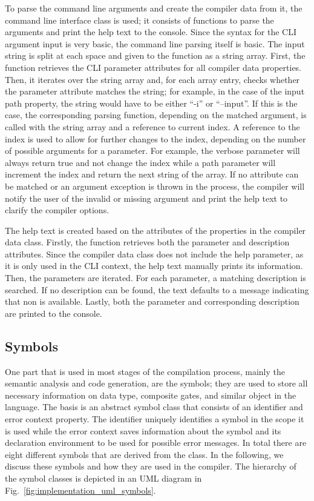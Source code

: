 To parse the command line arguments and create the compiler data from it, the command line interface class is used; it consists of functions to parse the arguments and print the help text to the console. Since the syntax for the CLI argument input is very basic, the command line parsing itself is basic. The input string is split at each space and given to the function as a string array. First, the function retrieves the CLI parameter attributes for all compiler data properties. Then, it iterates over the string array and, for each array entry, checks whether the parameter attribute matches the string; for example, in the case of the input path property, the string would have to be either ``-i'' or ``--input''. If this is the case, the corresponding parsing function, depending on the matched argument, is called with the string array and a reference to current index. A reference to the index is used to allow for further changes to the index, depending on the number of possible arguments for a parameter. For example, the verbose parameter will always return true and not change the index while a path parameter will increment the index and return the next string of the array. If no attribute can be matched or an argument exception is thrown in the process, the compiler will notify the user of the invalid or missing argument and print the help text to clarify the compiler options.

The help text is created based on the attributes of the properties in the compiler data class. Firstly, the function retrieves both the parameter and description attributes. Since the compiler data class does not include the help parameter, as it is only used in the CLI context, the help text manually prints its information. Then, the parameters are iterated. For each parameter, a matching description is searched. If no description can be found, the text defaults to a message indicating that non is available. Lastly, both the parameter and corresponding description are printed to the console.

\subsection{Symbols}
\label{sec:implementation_symbols}
One part that is used in most stages of the compilation process, mainly the semantic analysis and code generation, are the symbols; they are used to store all necessary information on data type, composite gates, and similar object in the language. The basis is an abstract symbol class that consists of an identifier and error context property. The identifier uniquely identifies a symbol in the scope it is used while the error context saves information about the symbol and its declaration environment to be used for possible error messages. In total there are eight different symbols that are derived from the class. In the following, we discuss these symbols and how they are used in the compiler. The hierarchy of the symbol classes is depicted in an UML diagram in Fig.~\ref{fig:implementation_uml_symbols}.

